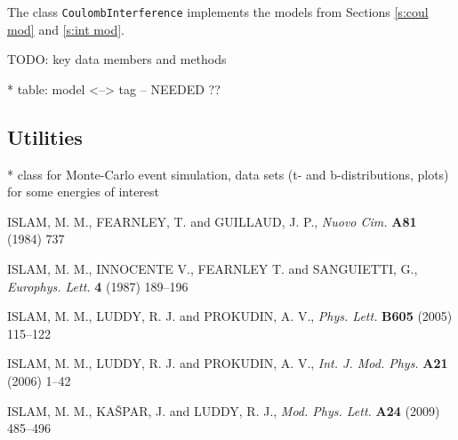 \documentclass[preprint,12pt]{elsarticle}
\begin{document}
The class {\tt CoulombInterference} implements the models from Sections \ref{s:coul mod} and \ref{s:int mod}.

TODO: key data members and methods

* table: model <--> tag -- NEEDED ??

\subsection{Utilities}\label{s:prog util}

* class for Monte-Carlo event simulation, data sets (t- and b-distributions, plots) for some energies of interest



\begin{thebibliography}{00}


\def\Name#1{#1, }
\def\REVIEW#1#2#3#4{{\it #1} {\bf #2} (#3) #4}

	\Name{ISLAM, M. M., FEARNLEY, T. and GUILLAUD, J. P.}
	\REVIEW{Nuovo Cim.}{A81}{1984}{737}

	\Name{ISLAM, M. M., INNOCENTE V., FEARNLEY T. and SANGUIETTI, G.}
	\REVIEW{Europhys. Lett.}{4}{1987}{189--196}


	\Name{ISLAM, M. M., LUDDY, R. J. and PROKUDIN, A. V.}
	\REVIEW{Phys. Lett.}{B605}{2005}{115--122}
    
	\Name{ISLAM, M. M., LUDDY, R. J. and PROKUDIN, A. V.}
	\REVIEW{Int. J. Mod. Phys.}{A21}{2006}{1--42}


	\Name{ISLAM, M. M., KA\v SPAR, J. and LUDDY, R. J.}
	\REVIEW{Mod. Phys. Lett.}{A24}{2009}{485--496}



\end{thebibliography}
\end{document}
